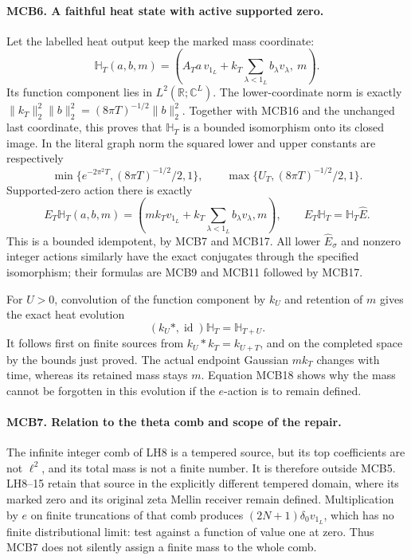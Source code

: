 \paragraph{MCB6. A faithful heat state with active supported zero.}
Let the labelled heat output keep the marked mass coordinate:
\[
 \mathbb H_T(a,b,m)=
   \left(A_Ta\,v_{1_L}+k_T\sum_{\lambda<1_L}b_\lambda v_\lambda,
           \ m\right).                             \tag{MCB17}
\]
Its function component lies in \(L^2(\mathbb R;\mathbb C^L)\).
The lower-coordinate norm is exactly
\(\|k_T\|_2^2\|b\|_2^2=(8\pi T)^{-1/2}\|b\|_2^2\).
Together with MCB16 and the unchanged last coordinate, this proves
that \(\mathbb H_T\) is a bounded isomorphism onto its closed
image. In the literal graph norm the squared lower and upper
constants are respectively
\[
 \min\{e^{-2\pi^2T},(8\pi T)^{-1/2}/2,1\},\qquad
 \max\{U_T,(8\pi T)^{-1/2}/2,1\}.
\]
Supported-zero action
there is exactly
\[
 E_T\mathbb H_T(a,b,m)
   =\left(m k_Tv_{1_L}+k_T\sum_{\lambda<1_L}b_\lambda v_\lambda,
                  m\right),\qquad
 E_T\mathbb H_T=\mathbb H_T\widehat E.              \tag{MCB18}
\]
This is a bounded idempotent, by MCB7 and MCB17. All lower
\(\widehat E_\sigma\) and nonzero integer actions similarly
have the exact conjugates through the specified isomorphism;
their formulas are MCB9 and MCB11 followed by MCB17.

For \(U>0\), convolution of the function component by \(k_U\)
and retention of \(m\) gives the exact heat evolution
\[
 (k_U*,\operatorname{id})\mathbb H_T
                  =\mathbb H_{T+U}.              \tag{MCB19}
\]
It follows first on finite sources from \(k_U*k_T=k_{U+T}\),
and on the completed space by the bounds just proved. The actual
endpoint Gaussian \(m k_T\) changes with time, whereas its
retained mass stays \(m\). Equation MCB18 shows why the mass
cannot be forgotten in this evolution if the \(e\)-action is
to remain defined.

\paragraph{MCB7. Relation to the theta comb and scope of the repair.}
The infinite integer comb of LH8 is a tempered source, but its
top coefficients are not \(\ell^2\), and its total mass is not
a finite number. It is therefore outside MCB5. LH8--15 retain
that source in the explicitly different tempered domain, where
its marked zero and its original zeta Mellin receiver remain
defined. Multiplication by \(e\) on finite truncations of that
comb produces \((2N+1)\delta_0v_{1_L}\), which has no finite
distributional limit: test against a function of value one at
zero. Thus MCB7 does not silently assign a finite mass to the
whole comb.

